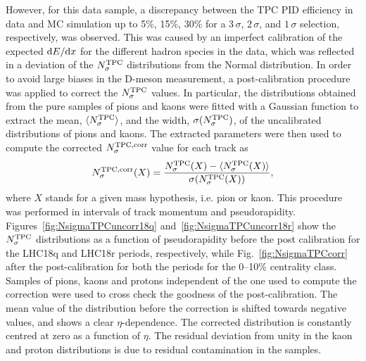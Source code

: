 However, for this data sample, a discrepancy between the TPC PID efficiency in data and MC simulation up to 5\%, 15\%, 30\% for a $3\,\sigma$, $2\,\sigma$, and $1\,\sigma$ selection, respectively, was observed. This was caused by an imperfect calibration of the expected ${\rm d} E/{\rm d} x$ for the different hadron species in the data, which was reflected in a deviation of the $N_{\sigma}^{\rm TPC}$ distributions from the Normal distribution. In order to avoid large biases in the D-meson measurement, a post-calibration procedure was applied to correct the $N_{\sigma}^{\rm TPC}$ values. In particular, the distributions obtained from the pure samples of pions and kaons were fitted with a Gaussian function to extract the mean, $\langle N_{\sigma}^{\rm TPC}\rangle$, and the width, $\sigma(N_{\sigma}^{\rm TPC})$, of the uncalibrated distributions of pions and kaons. The extracted parameters were then used to compute the corrected $N_{\sigma}^{\rm TPC, corr}$ value for each track as
\begin{equation}
N_{\sigma}^{\rm TPC, corr} (X) = \frac{N_{\sigma}^{\rm TPC} (X)-\langle N_{\sigma}^{\rm TPC} (X) \rangle}{\sigma(N_{\sigma}^{\rm TPC} (X))},
\end{equation}
where $X$ stands for a given mass hypothesis, i.e. pion or kaon. This procedure was performed in intervals of track momentum and pseudorapidity. Figures~\ref{fig:NsigmaTPCuncorr18q} and~\ref{fig:NsigmaTPCuncorr18r} show the $N_{\sigma}^{\rm TPC}$ distributions as a function of pseudorapidity before the post calibration for the LHC18q and LHC18r periods, respectively, while Fig.~\ref{fig:NsigmaTPCcorr} after the post-calibration for both the periods for the 0--10\% centrality class. Samples of pions, kaons and protons independent of the one used to compute the correction were used to cross check the goodness of the post-calibration. The mean value of the distribution before the correction is shifted towards negative values, and shows a clear $\eta$-dependence. The corrected distribution is constantly centred at zero as a function of $\eta$. The residual deviation from unity in the kaon and proton distributions is due to residual contamination in the samples.


